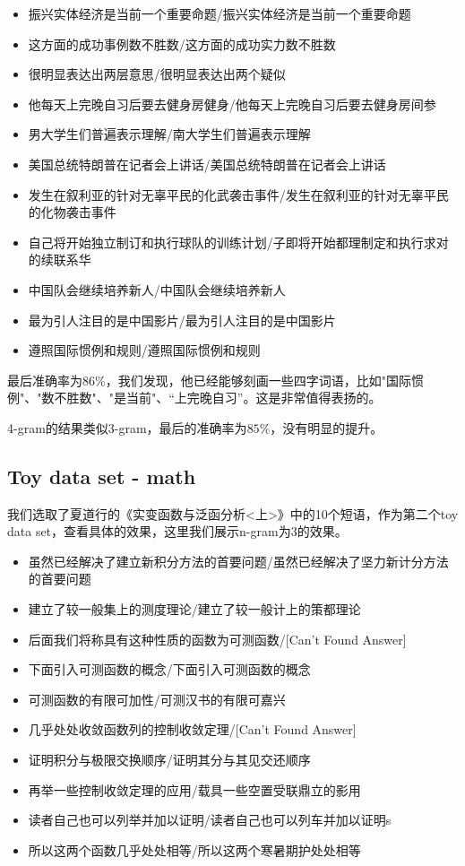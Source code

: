 \documentclass{article}
\begin{document}
\begin{itemize}
	\item 振兴实体经济是当前一个重要命题/振兴实体经济是当前一个重要命题
	\item 这方面的成功事例数不胜数/这方面的成功实力数不胜数
	\item 很明显表达出两层意思/很明显表达出两个疑似
	\item 他每天上完晚自习后要去健身房健身/他每天上完晚自习后要去健身房间参
	\item 男大学生们普遍表示理解/南大学生们普遍表示理解
	\item 美国总统特朗普在记者会上讲话/美国总统特朗普在记者会上讲话
	\item 发生在叙利亚的针对无辜平民的化武袭击事件/发生在叙利亚的针对无辜平民的化物袭击事件
	\item 自己将开始独立制订和执行球队的训练计划/子即将开始都理制定和执行求对的续联系华
	\item 中国队会继续培养新人/中国队会继续培养新人
	\item 最为引人注目的是中国影片/最为引人注目的是中国影片
	\item 遵照国际惯例和规则/遵照国际惯例和规则
\end{itemize}

最后准确率为$86\%$，我们发现，他已经能够刻画一些四字词语，比如"国际惯例"、"数不胜数"、"是当前"、“上完晚自习”。这是非常值得表扬的。

4-gram的结果类似3-gram，最后的准确率为$85\%$，没有明显的提升。

\subsection{Toy data set - math}

我们选取了夏道行的《实变函数与泛函分析<上>》中的10个短语，作为第二个toy data set，查看具体的效果，这里我们展示n-gram为3的效果。

\begin{itemize}
	\item 虽然已经解决了建立新积分方法的首要问题/虽然已经解决了坚力新计分方法的首要问题
	\item 建立了较一般集上的测度理论/建立了较一般计上的策都理论
	\item 后面我们将称具有这种性质的函数为可测函数/[Can't Found Answer]
	\item 下面引入可测函数的概念/下面引入可测函数的概念
	\item 可测函数的有限可加性/可测汉书的有限可嘉兴
	\item 几乎处处收敛函数列的控制收敛定理/[Can't Found Answer]
	\item 证明积分与极限交换顺序/证明其分与其见交还顺序
	\item 再举一些控制收敛定理的应用/载具一些空置受联鼎立的影用
	\item 读者自己也可以列举并加以证明/读者自己也可以列车并加以证明s
	\item 所以这两个函数几乎处处相等/所以这两个寒暑期护处处相等
\end{itemize}
\end{document}
